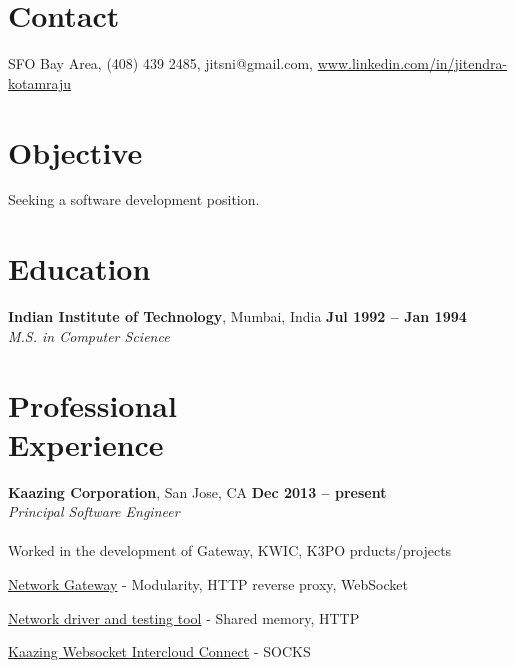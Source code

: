\documentclass[margin,line]{resume}
\begin{document}
\begin{resume}

\section{\mysidestyle Contact}

SFO Bay Area, (408) 439 2485, jitsni@gmail.com, \href{https://www.linkedin.com/in/jitendra-kotamraju-70b37b}{www.linkedin.com/in/jitendra-kotamraju}


\section{\mysidestyle Objective}

Seeking a software development position.

\section{\mysidestyle Education}

\textbf{Indian Institute of Technology}, Mumbai, India \hfill \textbf{Jul 1992 -- Jan 1994}\\
\textsl{M.S. in Computer Science}


\section{\mysidestyle Professional\\Experience}

    \textbf{Kaazing Corporation}, San Jose, CA \hfill \textbf{Dec 2013 -- present}\\ 
    \textsl{Principal Software Engineer}\\\\
Worked in the development of Gateway, KWIC, K3PO prducts/projects
    \begin{list2}
    \item \href{http://github.com/kaazing/gateway}{Network Gateway} - Modularity, HTTP reverse proxy, WebSocket
    \item \href{http://github.com/kaazing/k3po}{Network driver and testing tool} - Shared memory, HTTP
    \item \href{http://kaazing.com/product-kwic}{Kaazing Websocket Intercloud Connect} - SOCKS
    \end{list2}\vspace{-1.5mm}


\end{resume}
\end{document}
